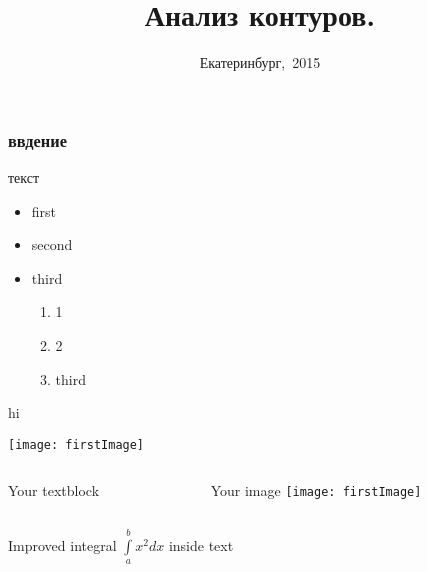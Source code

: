 \documentclass[notes,compress]{beamer}
\title
  	{{Анализ контуров.}}
\date{Екатеринбург,~2015}
\begin{document}
    \frame{\titlepage}
    \begin{frame}
        \frametitle{ввдение}
        {\Huge текст}
        \begin{itemize}
          \item<+-> first
          \item<+-> second
          \item<+-> third

            \begin{enumerate}
              \item<1-> 1
              \item<1-2> \alert<5-> {2}
              \item<3-> third
            \end{enumerate}
        \end{itemize}
         {hi}
    \end{frame}

    \begin{frame}
        \texttt{[image: firstImage]}
    \end{frame}

    \begin{frame}
    	\begin{columns}[T]
        	\begin{column}{.5\textwidth}
            	Your textblock
           	
        	\end{column}
        	\begin{column}{.5\textwidth}
            	\begin{block}{Your image}
                	\texttt{[image: firstImage]}
            	\end{block}
        	\end{column}
    	\end{columns}
	\end{frame}

    \begin{frame}
        Improved integral $\int\limits_{a}^{b} x^2 dx$ inside text
    \end{frame}
\end{document}

